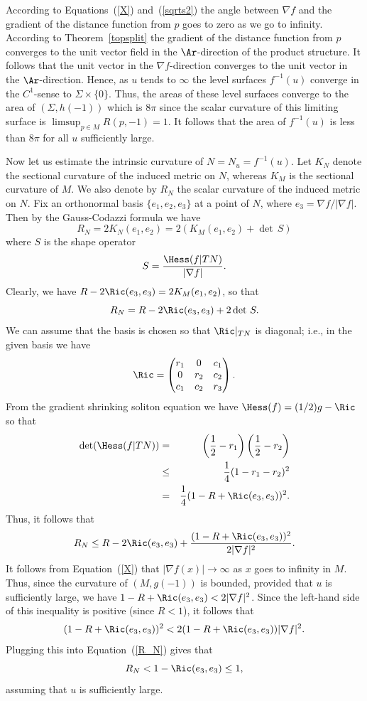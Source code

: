 According to Equations~(\ref{X}) and~(\ref{sqrts2}) the angle between $\nabla
f$ and the gradient of the distance function from $p$ goes to zero as we go to
infinity. According to Theorem~\ref{topsplit} the gradient of the distance
function from $p$ converges to the unit vector field in the $\Ar$-direction of
the product structure. It follows that the unit vector in the $\nabla
f$-direction converges to the unit vector in the $\Ar$-direction. Hence, as $u$
tends to $\infty$ the level surfaces $f^{-1}(u)$ converge in the $C^1$-sense to
$\Sigma\times \{0\}$. Thus, the areas of these level surfaces converge to the
area of $(\Sigma,h(-1))$ which is $8\pi$ since the scalar curvature of this
limiting surface is $\limsup_{p\in M} R(p,-1)= 1$. It follows that the
area of $f^{-1}(u)$ is less than $8\pi$ for all $u$ sufficiently large.

Now let us estimate the intrinsic curvature of $N=N_u=f^{-1}(u)$.
Let $K_N$ denote the sectional curvature of the induced metric on
$N$, whereas $K_M$ is the sectional curvature of $M$. We also denote
by $R_N$ the scalar curvature of the induced metric on $N$. Fix an
orthonormal basis $\{e_1,e_2,e_3\}$ at a point of $N$, where
$e_3=\nabla f/|\nabla f|$. Then by the Gauss-Codazzi formula we have
$$R_N=2K_N(e_1,e_2)=2(K_M(e_1,e_2)+\det\, S)$$
where $S$ is the shape operator
$$S=\frac{\Hess(f|TN)}{|\nabla f|}.$$
Clearly, we have $R-2\Ric(e_3,e_3)=2K_M(e_1,e_2)$, so that
$$R_N=R-2\Ric(e_3,e_3)+2\det\, S.$$
We can assume that the basis is chosen so that $\Ric|_{TN}$ is
diagonal; i.e., in the given basis we have
$$\Ric=\begin{pmatrix} r_1 & 0  & c_1 \\ 0 & r_2 & c_2 \\ c_1 & c_2 &
r_3\end{pmatrix}.$$ From the gradient shrinking soliton equation we
have $\Hess(f)=(1/2)g-\Ric$ so that \begin{eqnarray*}
\det(\Hess(f|TN)) & = & \left(\frac{1}{2}-r_1\right)\left(\frac{1}{2}- r_2\right) \\
& \le &
\frac{1}{4}(1-r_1-r_2)^2 \\
& = & \frac{1}{4} (1-R+\Ric(e_3,e_3))^2.
\end{eqnarray*}
Thus, it follows that \begin{equation}\label{R_N} R_N\le R-2
\Ric(e_3,e_3)+\frac{(1-R+\Ric(e_3,e_3))^2}{2|\nabla f|^2}.
\end{equation}
 It follows from Equation~(\ref{X}) that $|\nabla
f(x)|\rightarrow\infty$ as $x$ goes to infinity in $M$. Thus, since
the curvature of $(M,g(-1))$ is bounded, provided that $u$ is
sufficiently large, we have $1-R+\Ric(e_3,e_3)<2|\nabla f|^2$.
Since the left-hand side of this inequality is positive (since $R<
1$), it follows that
\begin{equation*}
(1-R+\Ric(e_3,e_3))^2  <  2(1-R+\Ric(e_3,e_3))|\nabla
f|^2.
\end{equation*}
Plugging this into Equation~(\ref{R_N}) gives that
$$R_N<1-\Ric(e_3,e_3)\le 1,$$
assuming that  $u$ is sufficiently large.

